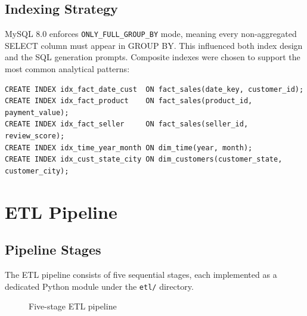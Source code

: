 \documentclass[12pt,a4paper]{report}
\begin{document}
\section{Indexing Strategy}

MySQL 8.0 enforces \texttt{ONLY\_FULL\_GROUP\_BY} mode, meaning every non-aggregated SELECT
column must appear in GROUP BY. This influenced both index design and the SQL generation
prompts. Composite indexes were chosen to support the most common analytical patterns:

\begin{lstlisting}[style=sqlcode, caption={Composite indexes on fact\_sales}]
CREATE INDEX idx_fact_date_cust  ON fact_sales(date_key, customer_id);
CREATE INDEX idx_fact_product    ON fact_sales(product_id, payment_value);
CREATE INDEX idx_fact_seller     ON fact_sales(seller_id, review_score);
CREATE INDEX idx_time_year_month ON dim_time(year, month);
CREATE INDEX idx_cust_state_city ON dim_customers(customer_state, customer_city);
\end{lstlisting}

\chapter{ETL Pipeline}
\label{ch:etl}

\section{Pipeline Stages}

The ETL pipeline consists of five sequential stages, each implemented as a dedicated Python
module under the \texttt{etl/} directory.

\begin{figure}[H]
  \centering
  \caption{Five-stage ETL pipeline}
  \label{fig:etl}
\end{figure}
\end{document}

